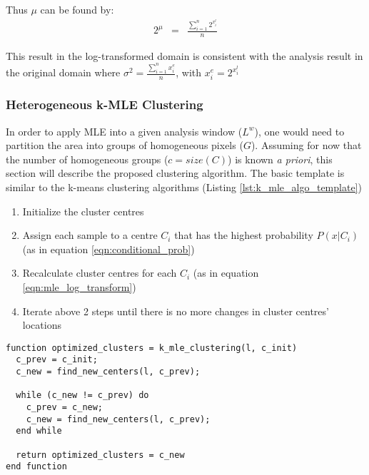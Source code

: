 Thus $\mu$ can be found by:
\begin{eqnarray}
2^\mu 
	&=& \frac{ \displaystyle{ \sum^n_{i=1}{ 2^{ x^l_i } }} }{n}  
\label{eqn:mle_log_transform}
\end{eqnarray}

This result in the log-transformed domain is consistent with the analysis result in the original domain where $\sigma^2 = \frac{\sum^n_{i=1}{x^e_i}}{n} $, with $x^e_i = 2^{x^l_i}$

\subsubsection{Heterogeneous k-MLE Clustering}

In order to apply MLE into a given analysis window ($L^w$), one would need to partition the area into groups of homogeneous pixels ($G$). 
Assuming for now that the number of homogeneous groups ($c=size(C)$) is known \textit{a priori}, this section will describe the proposed clustering algorithm. 
The basic template is similar to the k-means clustering algorithms (Listing \ref{lst:k_mle_algo_template})

\begin{enumerate}
\item Initialize the cluster centres
\item Assign each sample to a centre $C_i$ that has the highest probability $P(x|C_i)$ (as in equation \ref{eqn:conditional_prob})
\item Recalculate cluster centres for each $C_i$ (as in equation \ref{eqn:mle_log_transform})
\item Iterate above 2 steps until there is no more changes in cluster centres' locations
\end{enumerate}


\lstset{language=Matlab,caption=k-MLE Clustering Algorithm Template,label=lst:k_mle_algo_template}
\begin{lstlisting}[frame=tb]
function optimized_clusters = k_mle_clustering(l, c_init) 
  c_prev = c_init;
  c_new = find_new_centers(l, c_prev);

  while (c_new != c_prev) do
    c_prev = c_new;
    c_new = find_new_centers(l, c_prev);
  end while

  return optimized_clusters = c_new
end function
\end{lstlisting}

